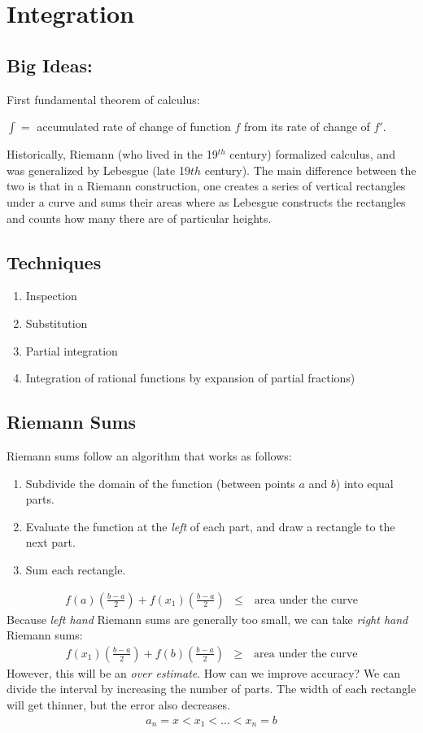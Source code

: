 \chapter{Integration}
\section{Big Ideas:}
First fundamental theorem of calculus:

$\int = $ accumulated rate of change of function $f$ from its rate of change
of $f'$.

Historically, Riemann (who lived in the 19$^{th}$ century) formalized calculus,
and was generalized by Lebesgue (late 19${th}$ century). The main difference
between the two is that in a Riemann construction, one creates a series of
vertical rectangles under a curve and sums their areas where as Lebesgue
constructs the rectangles and counts how many there are of particular heights.

\section{Techniques}
\begin{enumerate}
  \item Inspection
  \item Substitution
  \item Partial integration
  \item Integration of rational functions by expansion of partial fractions)
\end{enumerate}

\section{Riemann Sums}
Riemann sums follow an algorithm that works as follows:
\begin{enumerate}
  \item Subdivide the domain of the function (between points $a$ and $b$) into
  equal parts.
  \item Evaluate the function at the \emph{left} of each part, and draw a
  rectangle to the next part.
  \item Sum each rectangle.
\end{enumerate}
\begin{align}
  f(a)\left(\frac{b-a}{2}\right) + f(x_1)\left(\frac{b-a}{2}\right) & \leq \quad
    \text{area under the curve}
\end{align}
Because \emph{left hand} Riemann sums are generally too small, we can take
\emph{right hand} Riemann sums:
\begin{align}
  f(x_1)\left(\frac{b-a}{2}\right) + f(b)\left(\frac{b-a}{2}\right) & \geq \quad
    \text{area under the curve}
\end{align}
However, this will be an \emph{over estimate}. How can we improve accuracy? We
can divide the interval by increasing the number of parts. The width of each
rectangle will get thinner, but the error also decreases.
\begin{align}
  a_{n} = x < x_1 < \ldots < x_n = b
\end{align}

